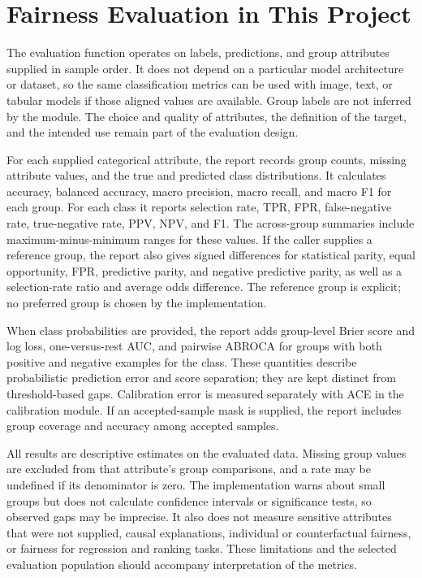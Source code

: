 \documentclass[12pt,a4paper]{article}
\begin{document}
\section{Fairness Evaluation in This Project}

The evaluation function operates on labels, predictions, and group attributes supplied in sample order. It does not depend on a particular model architecture or dataset, so the same classification metrics can be used with image, text, or tabular models if those aligned values are available. Group labels are not inferred by the module. The choice and quality of attributes, the definition of the target, and the intended use remain part of the evaluation design.

For each supplied categorical attribute, the report records group counts, missing attribute values, and the true and predicted class distributions. It calculates accuracy, balanced accuracy, macro precision, macro recall, and macro F1 for each group. For each class it reports selection rate, TPR, FPR, false-negative rate, true-negative rate, PPV, NPV, and F1. The across-group summaries include maximum-minus-minimum ranges for these values. If the caller supplies a reference group, the report also gives signed differences for statistical parity, equal opportunity, FPR, predictive parity, and negative predictive parity, as well as a selection-rate ratio and average odds difference. The reference group is explicit; no preferred group is chosen by the implementation.

When class probabilities are provided, the report adds group-level Brier score and log loss, one-versus-rest AUC, and pairwise ABROCA for groups with both positive and negative examples for the class. These quantities describe probabilistic prediction error and score separation; they are kept distinct from threshold-based gaps. Calibration error is measured separately with ACE in the calibration module. If an accepted-sample mask is supplied, the report includes group coverage and accuracy among accepted samples.

All results are descriptive estimates on the evaluated data. Missing group values are excluded from that attribute's group comparisons, and a rate may be undefined if its denominator is zero. The implementation warns about small groups but does not calculate confidence intervals or significance tests, so observed gaps may be imprecise. It also does not measure sensitive attributes that were not supplied, causal explanations, individual or counterfactual fairness, or fairness for regression and ranking tasks. These limitations and the selected evaluation population should accompany interpretation of the metrics.
\end{document}
